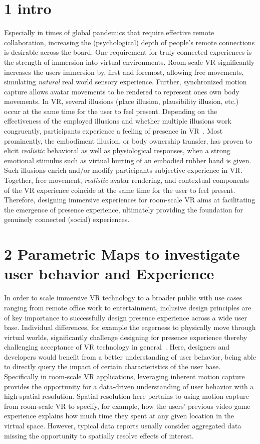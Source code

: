 \section{1 intro}
Especially in times of global pandemics that require effective remote collaboration, increasing the (psychological) depth of people's remote connections is desirable across the board. One requirement for truly connected experiences is the strength of immersion into virtual environments. Room-scale VR significantly increases the users immersion by, first and foremost, allowing free movements, simulating \textit{natural} real world sensory experience. Further, synchronized motion capture allows avatar movements to be rendered to represent ones own body movements. In VR, several illusions (place illusion, plausibility illusion, etc.) occur at the same time for the user to feel present. Depending on the effectiveness of the employed illusions and whether multiple illusions work congruently, participants experience a feeling of presence in VR~\cite{Gonzalez-Franco2017, Kilteni2012}. Most prominently, the embodiment illusion, or body ownership transfer, has proven to elicit \textit{realistic} behavioral as well as physiological responses, when a strong emotional stimulus such as virtual hurting of an embodied rubber hand is given. Such illusions enrich and/or modify participants subjective experience in VR. Together, free movement, \textit{realistic} avatar rendering, and contextual components of the VR experience coincide at the same time for the user to feel present. Therefore, designing immersive experiences for room-scale VR aims at facilitating the emergence of presence experience, ultimately providing the foundation for genuinely connected (social) experiences.

\section{2 Parametric Maps to investigate user behavior and Experience}

In order to scale immersive VR technology to a broader public with use cases ranging from remote office work to entertainment, inclusive design principles are of key importance to successfully design presence experience across a wide user base. Individual differences, for example the eagerness to physically move through virtual worlds, significantly challenge designing for presence experience thereby challenging acceptance of VR technology in general~\cite{Sagnier2020}. Here, designers and developers would benefit from a better understanding of user behavior, being able to directly query the impact of certain characteristics of the user base. Specifically in room-scale VR applications, leveraging inherent motion capture provides the opportunity for a data-driven understanding of user behavior with a high spatial resolution. Spatial resolution here pertains to using motion capture from room-scale VR to specify, for example, how the users' previous video game experience explains how much time they spent at any given location in the virtual space. However, typical data reports usually consider aggregated data missing the opportunity to spatially resolve effects of interest.

